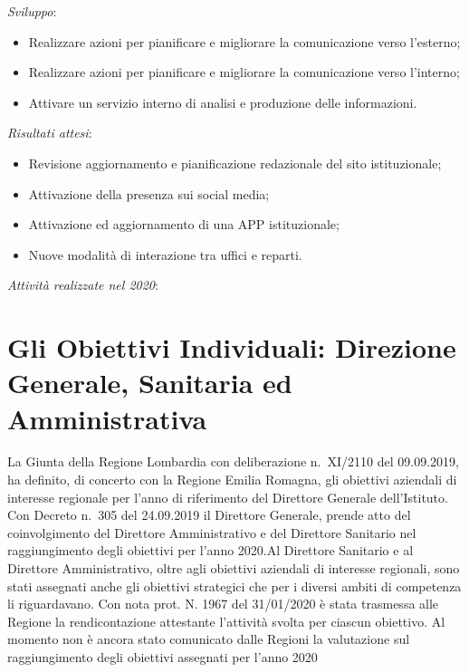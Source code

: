 \documentclass[
  12pt,
]{article}
\providecommand{\tightlist}{%
  \setlength{\itemsep}{0pt}\setlength{\parskip}{0pt}}
\begin{document}
\emph{Sviluppo}:

\begin{itemize}
\tightlist
\item
  Realizzare azioni per pianificare e migliorare la comunicazione verso
  l'esterno;
\item
  Realizzare azioni per pianificare e migliorare la comunicazione verso
  l'interno;
\item
  Attivare un servizio interno di analisi e produzione delle
  informazioni.
\end{itemize}

\emph{Risultati attesi}:

\begin{itemize}
\tightlist
\item
  Revisione aggiornamento e pianificazione redazionale del sito
  istituzionale;
\item
  Attivazione della presenza sui social media;
\item
  Attivazione ed aggiornamento di una APP istituzionale;
\item
  Nuove modalità di interazione tra uffici e reparti.
\end{itemize}

\emph{Attività realizzate nel 2020}:

\hypertarget{gli-obiettivi-individuali-direzione-generale-sanitaria-ed-amministrativa}{%
\section{Gli Obiettivi Individuali: Direzione Generale, Sanitaria ed
Amministrativa}\label{gli-obiettivi-individuali-direzione-generale-sanitaria-ed-amministrativa}}

La Giunta della Regione Lombardia con deliberazione n.~XI/2110 del
09.09.2019, ha definito, di concerto con la Regione Emilia Romagna, gli
obiettivi aziendali di interesse regionale per l'anno di riferimento del
Direttore Generale dell'Istituto. Con Decreto n.~305 del 24.09.2019 il
Direttore Generale, prende atto del coinvolgimento del Direttore
Amministrativo e del Direttore Sanitario nel raggiungimento degli
obiettivi per l'anno 2020.Al Direttore Sanitario e al Direttore
Amministrativo, oltre agli obiettivi aziendali di interesse regionali,
sono stati assegnati anche gli obiettivi strategici che per i diversi
ambiti di competenza li riguardavano. Con nota prot. N. 1967 del
31/01/2020 è stata trasmessa alle Regione la rendicontazione attestante
l'attività svolta per ciascun obiettivo. Al momento non è ancora stato
comunicato dalle Regioni la valutazione sul raggiungimento degli
obiettivi assegnati per l'anno 2020
\end{document}
